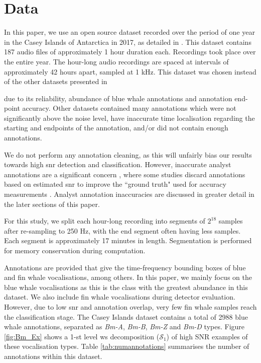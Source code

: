 \section{Data}
\label{sec:data}
In this paper, we use an open source dataset recorded over the period of one year in the Casey Islands of Antarctica in 2017, as detailed in \citep{casey2017}. This dataset contains 187 audio files of approximately 1 hour duration each. Recordings took place over the entire year. The hour-long audio recordings are spaced at intervals of approximately 42 hours apart, sampled at 1 kHz. This dataset was chosen instead of the other datasets presented in {\citep{casey2017} due to its reliability, abundance of blue whale annotations and annotation end-point accuracy. Other datasets contained many annotations which were not significantly above the noise level, have inaccurate time localisation regarding the starting and endpoints of the annotation, and/or did not contain enough annotations.

We do not perform any annotation cleaning, as this will unfairly bias our results towards high \ac{snr} detection and classification. However, inaccurate analyst annotations are a significant concern \citep{casey2019}, where some studies discard annotations based on estimated \ac{snr} to improve the ``ground truth" used for accuracy measurements \citep{blue_fin_detection}. Analyst annotation inaccuracies are discussed in greater detail in the later sections of this paper.

For this study, we split each hour-long recording into segments of $2^{18}$ samples after re-sampling to 250 Hz, with the end segment often having less samples. Each segment is approximately 17 minutes in length. Segmentation is performed for memory conservation during computation.

Annotations are provided that give the time-frequency bounding boxes of blue and fin whale vocalisations, among others. In this paper, we mainly focus on the blue whale vocalisations as this is the class with the greatest abundance in this dataset. We also include fin whale vocalisations during detector evaluation. However, due to low \ac{snr} and annotation overlap, very few fin whale samples reach the classification stage. The Casey Islands dataset contains a total of 2988 blue whale annotations, separated as \textit{Bm-A}, \textit{Bm-B}, \textit{Bm-Z} and \textit{Bm-D} types. Figure \ref{fig:Bm_Ex} shows a 1-st level \ac{ws} decomposition ($\mathcal{S}_1$) of high SNR examples of these vocalisation types. Table \ref{tab:numannotations} summarises the number of annotations within this dataset.

}
